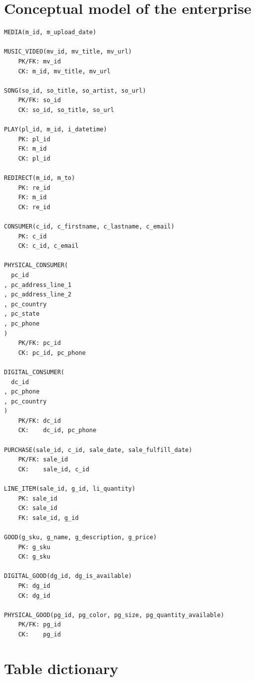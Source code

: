 \documentclass[11pt, a4paper]{report}
\begin{document}
\clearpage
\section{Conceptual model of the enterprise}

\begin{verbatim}
MEDIA(m_id, m_upload_date)

MUSIC_VIDEO(mv_id, mv_title, mv_url)
    PK/FK: mv_id
    CK: m_id, mv_title, mv_url

SONG(so_id, so_title, so_artist, so_url)
    PK/FK: so_id
    CK: so_id, so_title, so_url

PLAY(pl_id, m_id, i_datetime)
    PK: pl_id
    FK: m_id
    CK: pl_id

REDIRECT(m_id, m_to)
    PK: re_id
    FK: m_id
    CK: re_id

CONSUMER(c_id, c_firstname, c_lastname, c_email)
    PK: c_id
    CK: c_id, c_email

PHYSICAL_CONSUMER(
  pc_id
, pc_address_line_1
, pc_address_line_2
, pc_country
, pc_state
, pc_phone
)
    PK/FK: pc_id
    CK: pc_id, pc_phone

DIGITAL_CONSUMER(
  dc_id
, pc_phone
, pc_country
)
    PK/FK: dc_id
    CK:    dc_id, pc_phone

PURCHASE(sale_id, c_id, sale_date, sale_fulfill_date)
    PK/FK: sale_id
    CK:    sale_id, c_id

LINE_ITEM(sale_id, g_id, li_quantity)
    PK: sale_id
    CK: sale_id
    FK: sale_id, g_id

GOOD(g_sku, g_name, g_description, g_price)
    PK: g_sku
    CK: g_sku

DIGITAL_GOOD(dg_id, dg_is_available)
    PK: dg_id
    CK: dg_id

PHYSICAL_GOOD(pg_id, pg_color, pg_size, pg_quantity_available)
    PK/FK: pg_id
    CK:    pg_id
\end{verbatim}

\clearpage
\section{Table dictionary}
\end{document}

